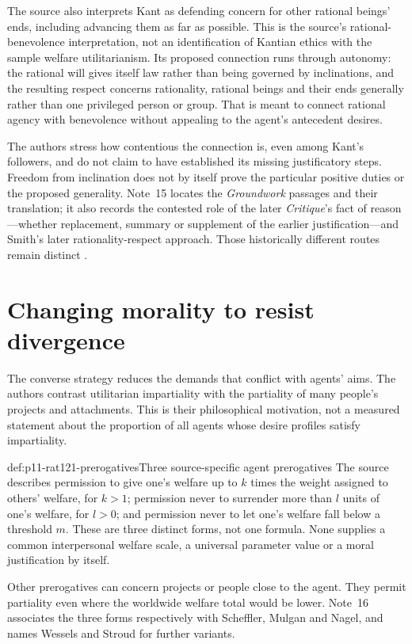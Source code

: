 The source also interprets Kant as defending concern for other
rational beings' ends, including advancing them as far as possible.
This is the source's rational-benevolence interpretation, not an
identification of Kantian ethics with the sample welfare utilitarianism.
Its proposed connection runs through autonomy:
the rational will gives itself law rather than being governed by
inclinations, and the resulting respect concerns rationality,
rational beings and their ends generally rather than one privileged
person or group. That is meant to connect rational agency with
benevolence without appealing to the agent's antecedent desires.

The authors stress how contentious the connection is, even among
Kant's followers, and do not claim to have established its missing
justificatory steps. Freedom from inclination does not by itself
prove the particular positive duties or the proposed generality.
Note~15 locates the \emph{Groundwork} passages and their translation;
it also records the contested role of the later \emph{Critique}'s
fact of reason---whether replacement, summary or supplement of
the earlier justification---and Smith's later rationality-respect
approach. Those historically different routes remain distinct
\parencite[p.~686 and n.~15]{FehigeWessels2021Morality}.

\section{Changing morality to resist divergence}
\label{sec:p11-rat121-rationalizing}

The converse strategy reduces the demands that conflict with agents'
aims. The authors contrast utilitarian impartiality with the partiality
of many people's projects and attachments. This is their philosophical
motivation, not a measured statement about the proportion of all
agents whose desire profiles satisfy impartiality.

\begin{hbdefinition}{def:p11-rat121-prerogatives}{Three source-specific agent prerogatives}
The source describes permission to give one's welfare up to
\(k\) times the weight assigned to others' welfare, for \(k>1\);
permission never to surrender more than \(l\) units of one's
welfare, for \(l>0\); and permission never to let one's welfare
fall below a threshold \(m\). These are three distinct forms,
not one formula. None supplies a common interpersonal welfare
scale, a universal parameter value or a moral justification by itself.

Other prerogatives can concern projects or people close to the agent.
They permit partiality even where the worldwide welfare total
would be lower. Note~16 associates the three forms respectively
with Scheffler, Mulgan and Nagel, and names Wessels and Stroud
for further variants.
\end{hbdefinition}

